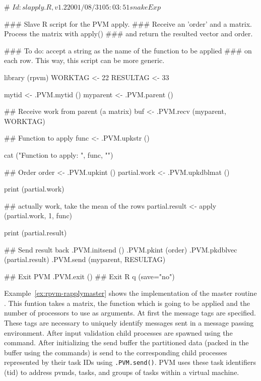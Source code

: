 \begin{Example}
\begin{Scode}
# $Id: slapply.R,v 1.2 2001/08/31 05:03:51 snake Exp $

### Slave R script for the PVM apply.
### Receive an 'order' and a matrix.  Process the matrix with apply()
### and return the resulted vector and order.

### To do: accept a string as the name of the function to be applied
### on each row.  This way, this script can be more generic. 

library (rpvm)
WORKTAG <- 22
RESULTAG <- 33

mytid  <- .PVM.mytid ()
myparent  <- .PVM.parent ()

## Receive work from parent (a matrix)
buf <- .PVM.recv (myparent, WORKTAG)

## Function to apply
func  <- .PVM.upkstr ()

cat ("Function to apply: ", func, "\n")

## Order
order <- .PVM.upkint ()
partial.work <- .PVM.upkdblmat ()

print (partial.work)

## actually work, take the mean of the rows
partial.result <- apply (partial.work, 1, func)

print (partial.result)

## Send result back
.PVM.initsend ()
.PVM.pkint (order)
.PVM.pkdblvec (partial.result)
.PVM.send (myparent, RESULTAG)

## Exit PVM
.PVM.exit ()
## Exit R
q (save="no")
\end{Scode}
\label{ex:rpvm-rapplyslave}
\end{Example}


Example~\ref{ex:rpvm-rapplymaster} shows the implementation of the
master routine . This funtion takes a matrix,
the function which is going to be applied and the number of processors
to use as arguments. At first 
the message tags are specified. These tags are necessary to uniquely
identify messages sent in a message passing environment. After
input validation  child processes are spawned using the
 command. After initializing the send buffer the
partitioned data (packed in the buffer using the 
commands) is send to the corresponding child processes represented by
their task IDs using
\texttt{.PVM.send()}. PVM uses these task identifiers (tid) to
address pvmds, tasks, and groups of tasks within a virtual
machine.

